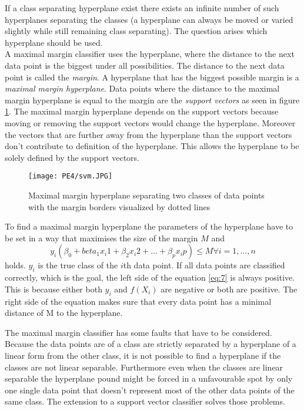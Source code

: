 If a class separating hyperplane exist there exists an infinite number of such hyperplanes separating the classes (a hyperplane can always be moved or varied slightly while still remaining class separating). The question arises which hyperplane should be used. 
\\
A maximal margin classifier uses the hyperplane, where the distance to the next data point  is the biggest under all possibilities. The distance to the next data point is called the \emph{margin}. A hyperplane that has the biggest possible margin is a \emph{maximal margin hyperplane}. Data points where the distance to the maximal margin hyperplane is equal to the margin are the \emph{support vectors} as seen in figure \ref{fig:mmh}. The maximal margin hyperplane depends on the support vectors because moving or removing the support vectors would change the hyperplane. Moreover the vectors that are further away from the hyperplane than the support vectors don't contribute to definition of the hyperplane. This allows the hyperplane to be solely defined by the support vectors.\\

\begin{figure}[h]
\centering
\texttt{[image: PE4/svm.JPG]}
\caption{Maximal margin hyperplane separating two classes of data points with the margin borders visualized by dotted lines}
\label{fig:mmh}
\end{figure}

To find a maximal margin hyperplane the parameters of the hyperplane have to be set in a way that maximises the size of the margin $M$ and
\begin{equation} \label{eq:7}
y_i(\beta_0+beta_1 x_i1 +\beta_2 x_i2 + ... +\beta_p x_ip) \leq M   \forall i=1,...,n
\end{equation}
holds.
$y_i$ is the true class of the $i$th data point. If all data points are classified correctly, which is the goal, the left side of the equation \ref{eq:7} is always positive. This is because either both $y_i$ and $f(X_i)$ are negative or both are positive. The right side of the equation makes sure that every data point has a minimal distance of M to the hyperplane.

The maximal margin classifier has some faults that have to be considered. Because the data points are of a class are strictly separated by a hyperplane of a linear form from the other class, it is not possible to find a hyperplane if the classes are not linear separable.  Furthermore even when the classes are linear separable the hyperplane pound might be forced in a unfavourable spot by only one single data point that doesn't represent most of the other data points of the same class. The extension to a support vector classifier solves those problems.

